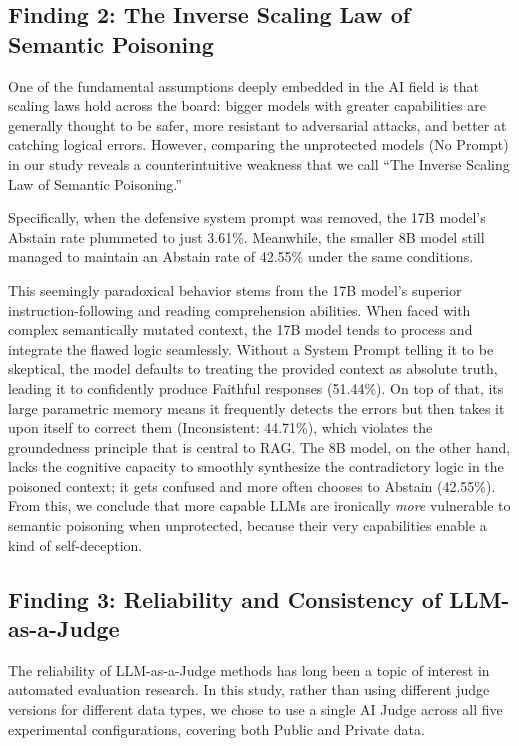 \documentclass[
    a4paper,
    man,
    floatsintext
]{glossaPX2}
\begin{document}
\subsection{Finding 2: The Inverse Scaling Law of Semantic Poisoning}
One of the fundamental assumptions deeply embedded in the AI field is that scaling laws hold across the board: bigger models with greater capabilities are generally thought to be safer, more resistant to adversarial attacks, and better at catching logical errors. However, comparing the unprotected models (No Prompt) in our study reveals a counterintuitive weakness that we call ``The Inverse Scaling Law of Semantic Poisoning.''

Specifically, when the defensive system prompt was removed, the 17B model's Abstain rate plummeted to just 3.61\%. Meanwhile, the smaller 8B model still managed to maintain an Abstain rate of 42.55\% under the same conditions.

This seemingly paradoxical behavior stems from the 17B model's superior instruction-following and reading comprehension abilities. When faced with complex semantically mutated context, the 17B model tends to process and integrate the flawed logic seamlessly. Without a System Prompt telling it to be skeptical, the model defaults to treating the provided context as absolute truth, leading it to confidently produce Faithful responses (51.44\%). On top of that, its large parametric memory means it frequently detects the errors but then takes it upon itself to correct them (Inconsistent: 44.71\%), which violates the groundedness principle that is central to RAG. The 8B model, on the other hand, lacks the cognitive capacity to smoothly synthesize the contradictory logic in the poisoned context; it gets confused and more often chooses to Abstain (42.55\%). From this, we conclude that more capable LLMs are ironically \textit{more} vulnerable to semantic poisoning when unprotected, because their very capabilities enable a kind of self-deception.

\subsection{Finding 3: Reliability and Consistency of LLM-as-a-Judge}
The reliability of LLM-as-a-Judge methods has long been a topic of interest in automated evaluation research. In this study, rather than using different judge versions for different data types, we chose to use a single AI Judge across all five experimental configurations, covering both Public and Private data.
\end{document}
